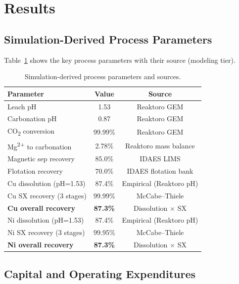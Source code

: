 \documentclass[11pt,a4paper]{article}
\begin{document}
\section{Results}
\label{sec:results}

\subsection{Simulation-Derived Process Parameters}

Table~\ref{tab:sim_params} shows the key process parameters with their
source (modeling tier).

\begin{table}[H]
\centering
\caption{Simulation-derived process parameters and sources.}
\label{tab:sim_params}
\begin{tabular}{@{}lcc@{}}
\toprule
\textbf{Parameter} & \textbf{Value} & \textbf{Source} \\
\midrule
Leach pH                           & 1.53   & Reaktoro GEM \\
Carbonation pH                     & 0.87   & Reaktoro GEM \\
CO\textsubscript{2} conversion     & 99.99\%& Reaktoro GEM \\
Mg\textsuperscript{2+} to carbonation & 2.78\% & Reaktoro mass balance \\
Magnetic sep recovery              & 85.0\% & IDAES LIMS \\
Flotation recovery                 & 70.0\% & IDAES flotation bank \\
Cu dissolution (pH=1.53)           & 87.4\% & Empirical (Reaktoro pH) \\
Cu SX recovery (3 stages)          & 99.99\%& McCabe--Thiele \\
\textbf{Cu overall recovery}       & \textbf{87.3\%} & Dissolution $\times$ SX \\
Ni dissolution (pH=1.53)           & 87.4\% & Empirical (Reaktoro pH) \\
Ni SX recovery (3 stages)          & 99.95\%& McCabe--Thiele \\
\textbf{Ni overall recovery}       & \textbf{87.3\%} & Dissolution $\times$ SX \\
\bottomrule
\end{tabular}
\end{table}

\subsection{Capital and Operating Expenditures}
\end{document}
